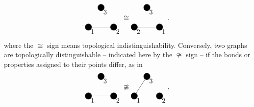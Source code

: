 \documentclass[8.5pt,twoside,twocolumn]{article}
\theoremstyle{standard}
\begin{document}
\begin{equation}
\begin{tikzpicture}[baseline={(current bounding box.center)}]
  \draw(0,0) node[circle,minimum size=.2cm,draw,fill=black] (A) {};
  \draw(1.3,0) node[circle,minimum size=.2cm,draw,fill=black] (B) {};
  \draw(.65,1) node[circle,minimum size=.2cm,draw,fill=black] (C) {};
  \draw (A.center) -- (B.center);
  \node [below right] at (A) {1};
  \node [below right] at (B) {2};
  \node [below right] at (C) {3};
\end{tikzpicture}
\cong
\begin{tikzpicture}[baseline={(current bounding box.center)}]
  \draw(0,0) node[circle,minimum size=.2cm,draw,fill=black] (A) {};
  \draw(1.3,0) node[circle,minimum size=.2cm,draw,fill=black] (B) {};
  \draw(.65,1) node[circle,minimum size=.2cm,draw,fill=black] (C) {};
  \draw (A.center) -- (B.center);
  \node [below right] at (A) {2};
  \node [below right] at (B) {1};
  \node [below right] at (C) {3};
\end{tikzpicture}.
\label{equivalent graph}
\end{equation}
where the $\cong$ sign means topological indistinguishability. Conversely, two graphs are 
topologically distinguishable -- indicated here by the $\ncong$ sign -- if the bonds or
properties assigned to their points differ, as in 
\begin{equation}
\begin{tikzpicture}[baseline={(current bounding box.center)}]
  \draw(0,0) node[circle,minimum size=.2cm,draw,fill=black] (A) {};
  \draw(1.3,0) node[circle,minimum size=.2cm,draw,fill=black] (B) {};
  \draw(.65,1) node[circle,minimum size=.2cm,draw,fill=black] (C) {};
  \draw (A.center) --  (B.center);
  \node [below right] at (A) {1};
  \node [below right] at (B) {2};
  \node [below right] at (C) {3};
\end{tikzpicture}
\ncong
\begin{tikzpicture}[baseline={(current bounding box.center)}]
  \draw(0,0) node[circle,minimum size=.2cm,draw,fill=black] (A) {};
  \draw(1.3,0) node[circle,minimum size=.2cm,draw,fill=black] (B) {};
  \draw(.65,1) node[circle,minimum size=.2cm,draw,fill=black] (C) {};
  \draw (A.center) -- (C.center);
  \node [below right] at (A) {1};
  \node [below right] at (B) {2};
  \node [below right] at (C) {3};
\end{tikzpicture},
\label{not equivalent graph}
\end{equation}
\end{document}
